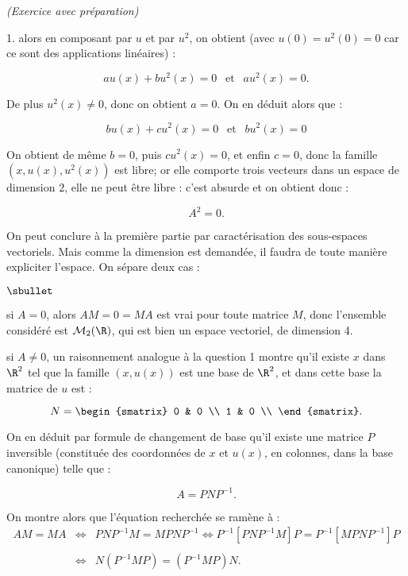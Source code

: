 \documentclass[11pt]{article}%
\begin{document}
\begin{exercice}{\it (Exercice avec préparation)}
\begin{noliste}{1.}
 alors en composant par $u$ et par $u^{2}$, on obtient (avec $u(0) =
u^{2} (0) = 0$ car ce sont des applications linéaires) : 
 
\[
 a u(x) + b u^{2} (x) = 0 \ \ \text{ et } \ \ a u^{2} (x) = 0. 
\]

 De plus $u^{2} (x) \neq 0$, donc on obtient $a = 0$. On en déduit
alors que : 
 
\[
 b u(x) + c u^{2} (x) = 0 \ \ \text{ et } \ \ b u^{2} (x) = 0 
\]

 On obtient de même $b = 0$, puis $c u^{2} (x) = 0$, et enfin $c = 0$,
donc la famille $(x, u(x), u^{2} (x) )$ est libre; or elle comporte
trois vecteurs dans un espace de dimension 2, elle ne peut être libre :
c'est absurde et on obtient donc : 
 
\[
 A^{2} = 0. 
\]

 \item On peut conclure à la première partie par caractérisation des
sous-espaces vectoriels. Mais comme la dimension est demandée, il
faudra de toute manière expliciter l'espace. On sépare deux cas :
\begin{noliste}{$\sbullet$}

 \item si $A = 0$, alors $A M = 0 = M A$ est vrai pour toute matrice
$M$, donc l'ensemble considéré est $\mathcal{M}_{2} ( \R )$, qui est
bien un espace vectoriel, de dimension 4. \\

 \item si $A \neq 0$, un raisonnement analogue à la question 1 montre
qu'il existe $x$ dans $\R^{2}$ tel que la famille $(x, u(x) )$ est une
base de $\R^{2}$, et dans cette base la matrice de $u$ est : 
 
\[
 N = \begin{smatrix}
0 & 0 \\
1 & 0 \\
\end{smatrix}. 
\]

 On en déduit par formule de changement de base qu'il existe une
matrice $P$ inversible (constituée des coordonnées de $x$ et $u(x)$, en
colonnes, dans la base canonique) telle que :
 
\[
 A = P N P^{-1}. 
\]

 On montre alors que l'équation recherchée se ramène à : 
 \begin{eqnarray*}
 A M = M A & \Longleftrightarrow & P N P^{-1} M = M P N P^{-1}
\Longleftrightarrow P^{-1} [ P N P^{-1} M ] P = P^{-1} [ M P N P^{-1} ]
P \\
\\
 & \Longleftrightarrow & N ( P ^{-1} M P ) = ( P^{-1} M P ) N. 
 \end{eqnarray*}


\end{noliste}
\end{noliste}
\end{exercice}
\end{document}
